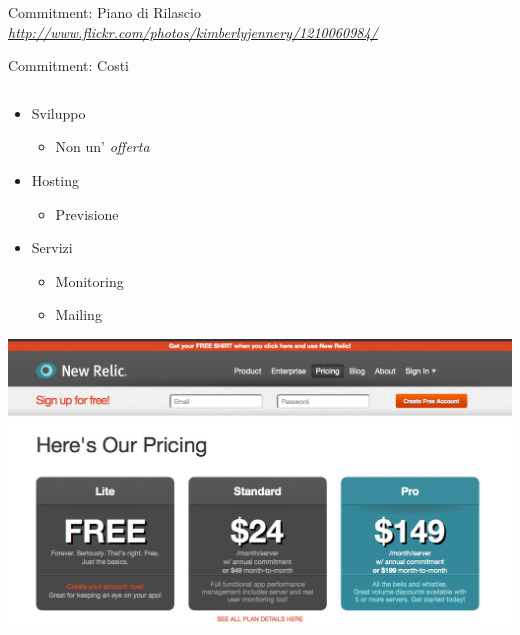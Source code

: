 \documentclass[compress, red, 14pt, pdf]{beamer}
\newcommand{\highlight}[1]{{\color{purple} \emph{#1}}}
\begin{document}
\begin{frame}{Commitment: Piano di Rilascio}
		\vspace*{1cm}
		{\footnotesize \highlight{\href{http://www.flickr.com/photos/kimberlyjennery/1210060984/}{http://www.flickr.com/photos/kimberlyjennery/1210060984/}}}

	\end{frame}
	
	\begin{frame}{Commitment: Costi}
		
		\begin{columns}[T]
		    \begin{column}{.5\textwidth}
			
				\begin{itemize}
					\item Sviluppo
						\begin{itemize}
							\item Non un'\highlight{offerta}
						\end{itemize}
					\item Hosting
						\begin{itemize}
							\item Previsione
						\end{itemize}
					\item Servizi
					\begin{itemize}
						\item Monitoring
						\item Mailing
					\end{itemize}
				\end{itemize}
				
				\vspace*{0.2cm}
				\hspace*{0.5cm} \includegraphics[scale=0.14]{images/costs-3}
    		\end{column}


\end{columns}
\end{frame}
\end{document}
